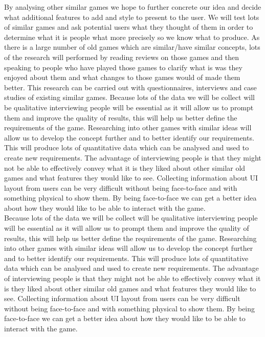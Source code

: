 \documentclass[10pt,a4paper,oneside]{report}
\begin{document}
By analysing other similar games we hope to further concrete our idea and decide what additional features to add and style to present to the user. We will test lots of similar games and ask potential users what they thought of them in order to determine what it is people what more precisely so we know what to produce. As there is a large number of old games which are similar/have similar concepts, lots of the research will performed by reading reviews on those games and then speaking to people who have played those games to clarify what is was they enjoyed about them and what changes to those games would of made them better. This research can be carried out with questionnaires, interviews and case studies of existing similar games. Because lots of the data we will be collect will be qualitative interviewing people will be essential as it will allow us to prompt them and improve the quality of results, this will help us better define the requirements of the game. Researching into other games with similar ideas will allow us to develop the concept further and to better identify our requirements. This will produce lots of quantitative data which can be analysed and used to create new requirements. The advantage of interviewing people is that they might not be able to effectively convey what it is they liked about other similar old games and what features they would like to see. Collecting information about UI layout from users can be very difficult without being face-to-face and with something physical to show them. By being face-to-face we can get a better idea about how they would like to be able to interact with the game.\\


Because lots of the data we will be collect will be qualitative interviewing people will be essential as it will allow us to prompt them and improve the quality of results, this will help us better define the requirements of the game. Researching into other games with similar ideas will allow us to develop the concept further and to better identify our requirements. This will produce lots of quantitative data which can be analysed and used to create new requirements. The advantage of interviewing people is that they might not be able to effectively convey what it is they liked about other similar old games and what features they would like to see. Collecting information about UI layout from users can be very difficult without being face-to-face and with something physical to show them. By being face-to-face we can get a better idea about how they would like to be able to interact with the game.\\
\end{document}
